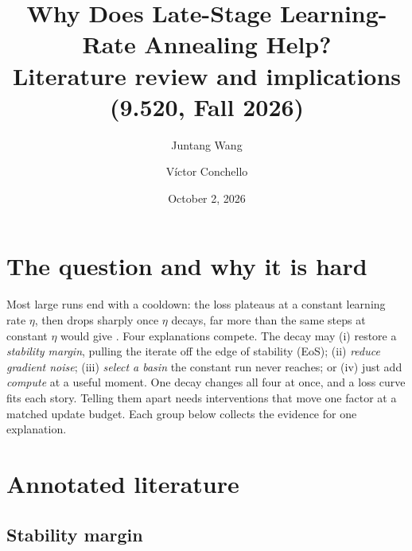 \documentclass[10pt]{article}
\title{\vspace{-1.6em}Why Does Late-Stage Learning-Rate Annealing Help?\\[2pt]
\large Literature review and implications (9.520, Fall 2026)}
\author{Juntang Wang \and V\'ictor Conchello}
\date{October 2, 2026}
\begin{document}
\maketitle
\vspace{-1.5em}

\section{The question and why it is hard}
\label{sec:question}

Most large runs end with a cooldown: the loss plateaus at a constant learning rate $\eta$, then drops
sharply once $\eta$ decays, far more than the same steps at constant $\eta$ would give
\citep{hagele2024scaling,wen2025river}. Four explanations compete. The decay may (i) restore a
\emph{stability margin}, pulling the iterate off the edge of stability (EoS); (ii) \emph{reduce
gradient noise}; (iii) \emph{select a basin} the constant run never reaches; or (iv) just add
\emph{compute} at a useful moment. One decay changes all four at once, and a loss curve fits each
story. Telling them apart needs interventions that move one factor at a matched update budget. Each
group below collects the evidence for one explanation.

\section{Annotated literature}
\label{sec:lit}

\subsection{Stability margin}
\label{sec:lit-stability}


\end{document}
